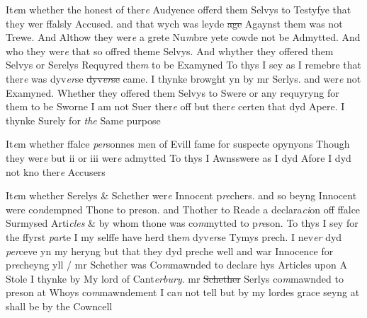 \documentclass[12pt, a4paper]{book}
\begin{document}
 
		\ifthenelse{\isodd{\thepage}}
		{\reversemarginpar}
		{\normalmarginpar}
		It\textit{e}m whether the honest of ther\textit{e} Audyence offerd them Selvys to
Testyfye that they wer ffalsly Accused. and that wych was leyde \sout{age}
Agaynst them was not Trewe. And Althow they wer\textit{e} a grete Nu\textit{m}bre
yete cowde not be Admytted. And who they wer\textit{e} that so offred theme
Selvys. And whyther they offered them Selvys or Serelys Requyred 
the\textit{m} to be Examyned
To thys I sey as I remebre that ther\textit{e} was dyv\textit{er}se \sout{dyv\textit{er}se }came. I thynke browght
yn by mr Serlys. and wer\textit{e} not Examyned. Whether they offered them
Selvys to Swere or any requyryng for them to be Sworne I am not Suer
ther\textit{e} off but ther\textit{e} certen that dyd
			 Apere. I thynke Surely for \textit{the} Same purpose

				\marginpar[\vspace{0.5cm}{\textcolor{Gray}{7}}]{}
			

		\ifthenelse{\isodd{\thepage}}
		{\reversemarginpar}
		{\normalmarginpar}
		 It\textit{e}m whether ffalce \textit{per}sonnes men of Evill fame for suspecte opynyons
Though they wer\textit{e} but ii or iii wer\textit{e} admytted
To thys I Awnsswere as I dyd Afore I dyd not kno ther\textit{e} Accusers

				\marginpar[\vspace{0.5cm}{\textcolor{Gray}{8}}]{}
			

		\ifthenelse{\isodd{\thepage}}
		{\reversemarginpar}
		{\normalmarginpar}
		 It\textit{e}m whether Serelys \& Schether 
			wer\textit{e} Innocent p\textit{re}chers. and so beyng Innocent
were co\textit{n}dempned Thone to preson. and Thother to Reade a declara\textit{ci}on 
off ffalce Surmysed Arti\textit{cles} \& by whom thone was co\textit{m}mytted to p\textit{re}son. 
To thys I sey for the ffyrst \textit{par}te I my selffe have herd the\textit{m} dyv\textit{er}se Tymys
prech. I nev\textit{er} dyd \textit{per}ceve yn my heryng but that they dyd preche well and
war Innocence for p\textit{re}cheyng yll / mr Schether was Co\textit{m}mawnded to 
declare hys Articles upon A Stole I thynke by My lord of Cant\textit{erbury}. mr
\sout{Schether }
               Serlys 
			co\textit{m}mawnded to preson at Whoys co\textit{m}mawndement I ca\textit{n} not tell
but by my lordes grace  seyng at shall be by the Cowncell
\end{document}

